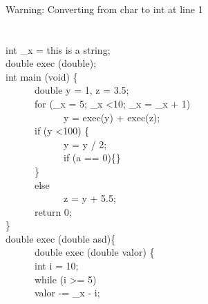 \documentclass[tikz,border=10pt]{standalone}
\begin{document}
\phantom \\
\phantom \\
\phantom \\
Warning: Converting from char to int at line 1 \\

\\
\\

int \_x = \textquotesingle this is a string\textquotesingle;\\

double exec (double);\\

int main (void) \{\\

\ \ \ \ \ \    double y = 1, z = 3.5;\\

\ \ \ \ \ \    for (\_x = 5; \_x \textless 10; \_x = \_x + 1)\\

\ \ \ \ \ \    \ \ \ \ \ \    y = exec(y) + exec(z);\\

\ \ \ \ \ \    if (y \textless 100) \{\\

\ \ \ \ \ \    \ \ \ \ \ \    y = y / 2;\\

\ \ \ \ \ \      \ \ \ \ \ \  if (a == 0)\{\}\\

\ \ \ \ \ \   \}\\

 \ \ \ \ \ \   else\\

 \ \ \ \ \ \  \ \ \ \ \ \     z = y + 5.5;\\

\ \ \ \ \ \    return 0;\\

\} \\

double exec (double asd)\{\\

\ \ \ \ \ \ double exec (double valor) \{\\

 \ \ \ \ \ \    int i = 10;\\

\ \ \ \ \ \     while (i \textgreater = 5)\\

\ \ \ \ \ \         valor -= \_x - i;\\
\end{document}
